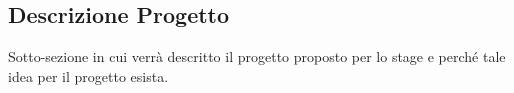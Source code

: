 \subsection{Descrizione Progetto}

Sotto-sezione in cui verrà descritto il progetto proposto per lo stage e perché tale idea per il progetto esista.